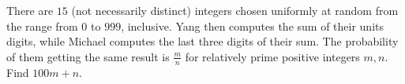 There are $15$ (not necessarily distinct) integers chosen uniformly at random from the range from $0$ to $999$, inclusive. Yang then computes the sum of their units digits, while Michael computes the last three digits of their sum. The probability of them getting the same result is $\frac mn$ for relatively prime positive integers $m,n$. Find $100m+n$.
